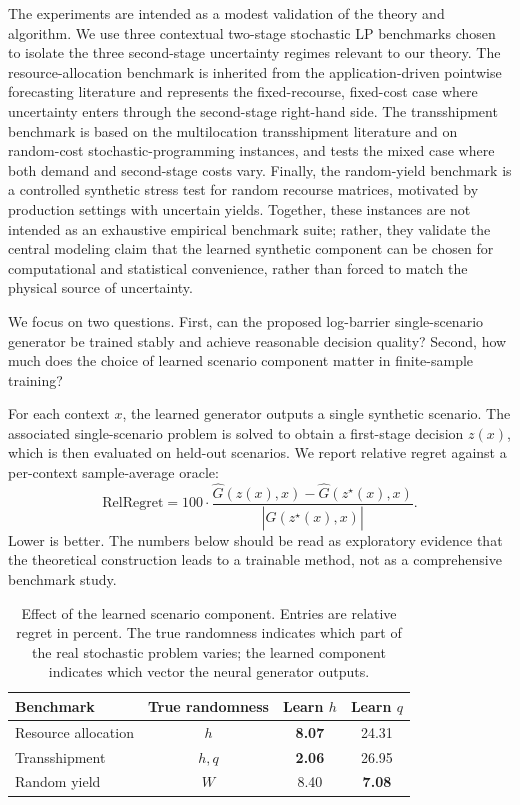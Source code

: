 \documentclass{article}
\newcommand{\1}{\mathbf{1}}
\theoremstyle{plain}
\theoremstyle{definition}
\theoremstyle{remark}
\begin{document}
The experiments are intended as a modest validation of the theory and algorithm. We use three contextual two-stage stochastic LP benchmarks chosen to isolate the three second-stage uncertainty regimes relevant to our theory. The resource-allocation benchmark is inherited from the application-driven pointwise forecasting literature and represents the fixed-recourse, fixed-cost case where uncertainty enters through the second-stage right-hand side. The transshipment benchmark is based on the multilocation transshipment literature and on random-cost stochastic-programming instances, and tests the mixed case where both demand and second-stage costs vary. Finally, the random-yield benchmark is a controlled synthetic stress test for random recourse matrices, motivated by production settings with uncertain yields. Together, these instances are not intended as an exhaustive empirical benchmark suite; rather, they validate the central modeling claim that the learned synthetic component can be chosen for computational and statistical convenience, rather than forced to match the physical source of uncertainty.

We focus on two questions. First, can the proposed log-barrier single-scenario generator be trained stably and achieve reasonable decision quality? Second, how much does the choice of learned scenario component matter in finite-sample training?

For each context $x$, the learned generator outputs a single synthetic scenario. The associated single-scenario problem is solved to obtain a first-stage decision $z(x)$, which is then evaluated on held-out scenarios. We report relative regret against a per-context sample-average oracle:
\[
\mathrm{RelRegret}
=
100\cdot
\frac{
\widehat G(z(x),x)-\widehat G(z^\star(x),x)
}{
|\widehat G(z^\star(x),x)|
}.
\]
Lower is better. The numbers below should be read as exploratory evidence that the theoretical construction leads to a trainable method, not as a comprehensive benchmark study.

\begin{table}[t]
\centering
\small
\caption{Effect of the learned scenario component. Entries are relative regret in percent. The true randomness indicates which part of the real stochastic problem varies; the learned component indicates which vector the neural generator outputs.}
\label{tab:component-choice}
\begin{tabular}{lccc}
\hline
Benchmark & True randomness & Learn $h$ & Learn $q$ \\
\hline
Resource allocation & $h$ & \textbf{8.07} & 24.31 \\
Transshipment & $h,q$ & \textbf{2.06} & 26.95 \\
Random yield & $W$ & 8.40 & \textbf{7.08} \\
\hline
\end{tabular}
\end{table}
\end{document}
